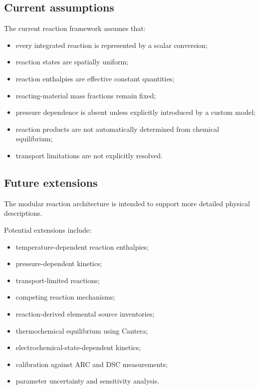 \subsection{Current assumptions}

The current reaction framework assumes that:

\begin{itemize}
    \item every integrated reaction is represented by a scalar conversion;
    \item reaction states are spatially uniform;
    \item reaction enthalpies are effective constant quantities;
    \item reacting-material mass fractions remain fixed;
    \item pressure dependence is absent unless explicitly introduced by a
          custom model;
    \item reaction products are not automatically determined from
          chemical equilibrium;
    \item transport limitations are not explicitly resolved.
\end{itemize}


\subsection{Future extensions}

The modular reaction architecture is intended to support more detailed
physical descriptions.

Potential extensions include:

\begin{itemize}
    \item temperature-dependent reaction enthalpies;
    \item pressure-dependent kinetics;
    \item transport-limited reactions;
    \item competing reaction mechanisms;
    \item reaction-derived elemental source inventories;
    \item thermochemical equilibrium using Cantera;
    \item electrochemical-state-dependent kinetics;
    \item calibration against ARC and DSC measurements;
    \item parameter uncertainty and sensitivity analysis.
\end{itemize}
